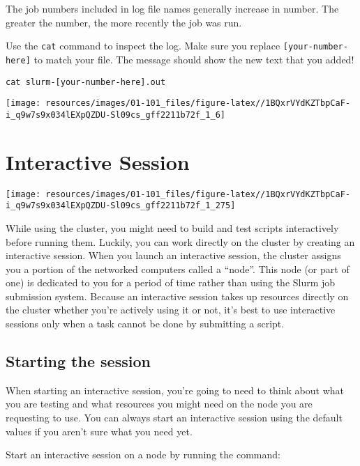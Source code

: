 \documentclass[
]{book}
\begin{document}
The job numbers included in log file names generally increase in number. The greater the number, the more recently the job was run.

Use the \texttt{cat} command to inspect the log. Make sure you replace \texttt{{[}your-number-here{]}} to match your file. The message should show the new text that you added!

\begin{verbatim}
cat slurm-[your-number-here].out
\end{verbatim}

\texttt{[image: resources/images/01-101\_files/figure-latex//1BQxrVYdKZTbpCaF-i\_q9w7s9x034lEXpQZDU-Sl09cs\_gff2211b72f\_1\_6]}

\hypertarget{interactive-session}{%
\chapter{Interactive Session}\label{interactive-session}}

\texttt{[image: resources/images/01-101\_files/figure-latex//1BQxrVYdKZTbpCaF-i\_q9w7s9x034lEXpQZDU-Sl09cs\_gff2211b72f\_1\_275]}

While using the cluster, you might need to build and test scripts interactively before running them. Luckily, you can work directly on the cluster by creating an interactive session. When you launch an interactive session, the cluster assigns you a portion of the networked computers called a ``node''. This node (or part of one) is dedicated to you for a period of time rather than using the Slurm job submission system. Because an interactive session takes up resources directly on the cluster whether you're actively using it or not, it's best to use interactive sessions only when a task cannot be done by submitting a script.

\hypertarget{starting-the-session}{%
\section{Starting the session}\label{starting-the-session}}

When starting an interactive session, you're going to need to think about what you are testing and what resources you might need on the node you are requesting to use. You can always start an interactive session using the default values if you aren't sure what you need yet.

Start an interactive session on a node by running the command:
\end{document}
